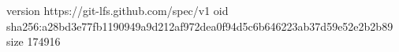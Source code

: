 version https://git-lfs.github.com/spec/v1
oid sha256:a28bd3e77fb1190949a9d212af972dea0f94d5c6b646223ab37d59e52e2b2b89
size 174916
